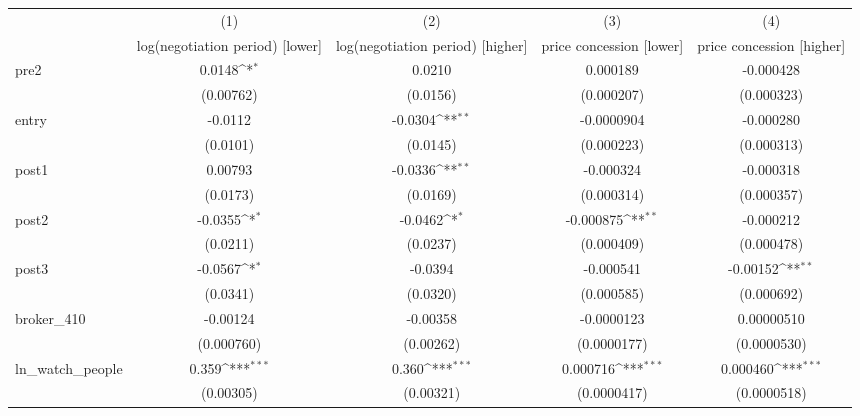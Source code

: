 {
\def\sym#1{\ifmmode^{#1}\else\(^{#1}\)\fi}
\begin{tabular}{l*{4}{c}}
\toprule
            &\multicolumn{1}{c}{(1)}&\multicolumn{1}{c}{(2)}&\multicolumn{1}{c}{(3)}&\multicolumn{1}{c}{(4)}\\
            &\multicolumn{1}{c}{log(negotiation period) [lower]}&\multicolumn{1}{c}{log(negotiation period) [higher]}&\multicolumn{1}{c}{price concession [lower]}&\multicolumn{1}{c}{price concession [higher]}\\
\midrule
pre2        &      0.0148\sym{*}  &      0.0210         &    0.000189         &   -0.000428         \\
            &   (0.00762)         &    (0.0156)         &  (0.000207)         &  (0.000323)         \\
\addlinespace
entry       &     -0.0112         &     -0.0304\sym{**} &  -0.0000904         &   -0.000280         \\
            &    (0.0101)         &    (0.0145)         &  (0.000223)         &  (0.000313)         \\
\addlinespace
post1       &     0.00793         &     -0.0336\sym{**} &   -0.000324         &   -0.000318         \\
            &    (0.0173)         &    (0.0169)         &  (0.000314)         &  (0.000357)         \\
\addlinespace
post2       &     -0.0355\sym{*}  &     -0.0462\sym{*}  &   -0.000875\sym{**} &   -0.000212         \\
            &    (0.0211)         &    (0.0237)         &  (0.000409)         &  (0.000478)         \\
\addlinespace
post3       &     -0.0567\sym{*}  &     -0.0394         &   -0.000541         &    -0.00152\sym{**} \\
            &    (0.0341)         &    (0.0320)         &  (0.000585)         &  (0.000692)         \\
\addlinespace
broker\_410  &    -0.00124         &    -0.00358         &  -0.0000123         &  0.00000510         \\
            &  (0.000760)         &   (0.00262)         & (0.0000177)         & (0.0000530)         \\
\addlinespace
ln\_watch\_people&       0.359\sym{***}&       0.360\sym{***}&    0.000716\sym{***}&    0.000460\sym{***}\\
            &   (0.00305)         &   (0.00321)         & (0.0000417)         & (0.0000518)         \\

\end{tabular}}
